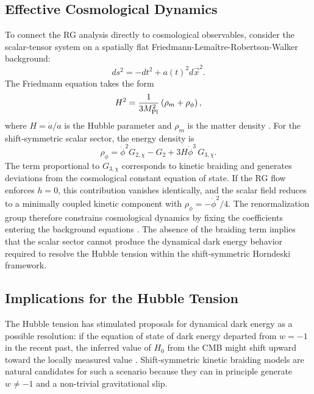 \documentclass[12pt,a4paper]{article}
\begin{document}
\subsection{Effective Cosmological Dynamics}

To connect the RG analysis directly to cosmological observables, consider the
scalar-tensor system on a spatially flat Friedmann-Lema\^itre-Robertson-Walker
background:
\begin{equation}
ds^2 = -dt^2 + a(t)^2 d\vec{x}^2.
\end{equation}
The Friedmann equation takes the form
\begin{equation}
H^2 = \frac{1}{3M_{\rm Pl}^2}\left(\rho_m + \rho_\phi\right),
\end{equation}
where $H = \dot a/a$ is the Hubble parameter and $\rho_m$ is the matter
density \cite{Mukhanov2005,Weinberg2008}. For the shift-symmetric scalar sector,
the energy density is
\begin{equation}
\rho_\phi = \dot\phi^2 G_{2,\chi} - G_2 + 3H\dot\phi^3\,G_{3,\chi}.
\end{equation}
The term proportional to $G_{3,\chi}$ corresponds to kinetic braiding and
generates deviations from the cosmological constant equation of state. If the
RG flow enforces $h = 0$, this contribution vanishes identically, and the
scalar field reduces to a minimally coupled kinetic component with
$\rho_\phi = -\dot\phi^2/4$. The renormalization group therefore constrains
cosmological dynamics by fixing the coefficients entering the background
equations \cite{EichhornLinoWagner2023,Peebles1980}. The absence of the
braiding term implies that the scalar sector cannot produce the dynamical dark
energy behavior required to resolve the Hubble tension within the
shift-symmetric Horndeski framework.

\subsection{Implications for the Hubble Tension}

The Hubble tension has stimulated proposals for dynamical dark energy as a
possible resolution: if the equation of state of dark energy departed from
$w = -1$ in the recent past, the inferred value of $H_0$ from the CMB might
shift upward toward the locally measured value \cite{Planck2018,Riess2019}.
Shift-symmetric kinetic braiding models are natural candidates for such a
scenario because they can in principle generate $w \neq -1$ and a non-trivial
gravitational slip.
\end{document}
